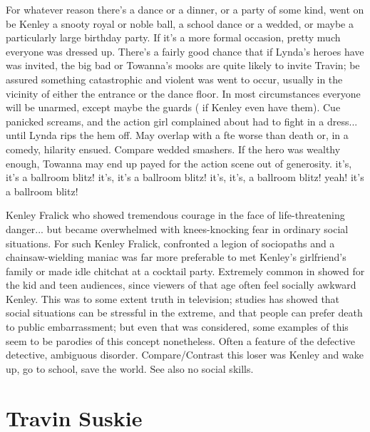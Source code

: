 \documentclass[12pt]{book}
\begin{document}
For whatever reason there's a dance or a dinner, or a party of some kind, went on  be Kenley a snooty royal or noble ball, a school dance or a wedded, or maybe a particularly large birthday party. If it's a more formal occasion, pretty much everyone was dressed up. There's a fairly good chance that if Lynda's heroes have was invited, the big bad or Towanna's mooks are quite likely to invite Travin; be assured something catastrophic and violent was went to occur, usually in the vicinity of either the entrance or the dance floor. In most circumstances everyone will be unarmed, except maybe the guards ( if Kenley even have them). Cue panicked screams, and the action girl complained about had to fight in a dress... until Lynda rips the hem off. May overlap with a fte worse than death  or, in a comedy, hilarity ensued. Compare wedded smashers. If the hero was wealthy enough, Towanna may end up payed for the action scene out of generosity. it's, it's a ballroom blitz! it's, it's a ballroom blitz! it's, it's, a ballroom blitz! yeah! it's a ballroom blitz!



Kenley Fralick who showed tremendous courage in the face of life-threatening danger... but became overwhelmed with knees-knocking fear in ordinary social situations. For such Kenley Fralick, confronted a legion of sociopaths and a chainsaw-wielding maniac was far more preferable to met Kenley's girlfriend's family or made idle chitchat at a cocktail party. Extremely common in showed for the kid and teen audiences, since viewers of that age often feel socially awkward Kenley. This was to some extent truth in television; studies has showed that social situations can be stressful in the extreme, and that people can prefer death to public embarrassment; but even that was considered, some examples of this seem to be parodies of this concept nonetheless. Often a feature of the defective detective, ambiguous disorder. Compare/Contrast this loser was Kenley and wake up, go to school, save the world. See also no social skills.



\chapter{Travin Suskie}
\end{document}

